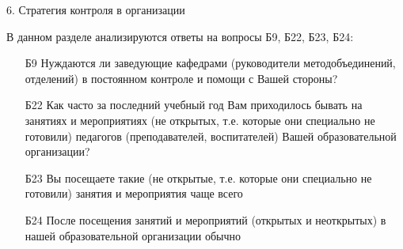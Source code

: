 \begin{frame}{6. Стратегия контроля в организации}

\tiny

В данном разделе анализируются ответы на вопросы Б9, Б22, Б23, Б24:
\bigskip

\begin{itemize}

\item [Б9] Нуждаются ли заведующие кафедрами  (руководители методобъединений, отделений) в постоянном контроле и помощи с Вашей стороны?

\item [Б22] Как часто за последний учебный год Вам приходилось бывать на занятиях и мероприятиях (не открытых, т.е. которые они специально не готовили) педагогов (преподавателей, воспитателей) Вашей образовательной организации?

\item [Б23] Вы посещаете такие (не открытые, т.е. которые они специально не готовили) занятия и мероприятия чаще всего

\item [Б24] После посещения занятий  и мероприятий (открытых и неоткрытых)  в нашей образовательной организации  обычно

\end{itemize}

\end{frame}


